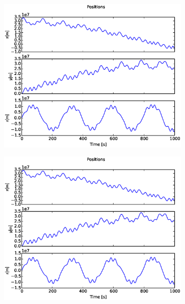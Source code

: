 \documentclass[x11names]{article}
\begin{document}
    \begin{figure}
      \begin{subfigure}{0.45\textwidth}
        \includegraphics[width = \textwidth]{figures/ion_8_5_Eulerxyz}
      \end{subfigure}
      \begin{subfigure}{0.45\textwidth}
        \includegraphics[width = \textwidth]{figures/ion_8_5_Verletxyz}
      \end{subfigure}
      \begin{subfigure}{0.45\textwidth}

\end{subfigure}
\end{figure}
\end{document}
